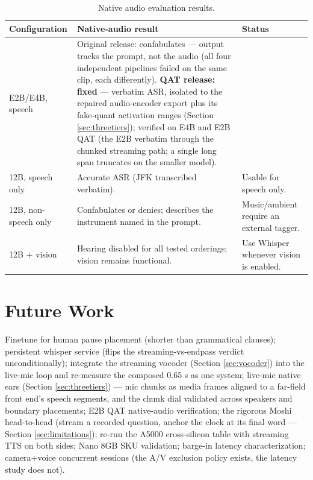 \documentclass{article}
\begin{document}
\begin{table}[H]
	\centering
	\small
	\begin{tabularx}{\textwidth}{lXX}
		\toprule
		Configuration & Native-audio result & Status \\
		\midrule
		E2B/E4B, speech &
		Original release: confabulates — output tracks the prompt, not the audio (all four independent pipelines failed on the same clip, each differently). \textbf{QAT release: fixed} — verbatim ASR, isolated to the repaired audio-encoder export plus its fake-quant activation ranges (Section \ref{sec:threetiers}); verified on E4B and E2B QAT (the E2B verbatim through the chunked streaming path; a single long span truncates on the smaller model). \\

		12B, speech only &
		Accurate ASR (JFK transcribed verbatim). &
		Usable for speech only. \\

		12B, non-speech only &
		Confabulates or denies; describes the instrument named in the prompt. &
		Music/ambient require an external tagger. \\

		12B + vision &
		Hearing disabled for all tested orderings; vision remains functional. &
		Use Whisper whenever vision is enabled. \\
		\bottomrule
	\end{tabularx}
	\caption{Native audio evaluation results.}
	\label{tab:native-audio}
\end{table}

\section{Future Work}
\label{sec:future}

Finetune for human pause placement (shorter than grammatical clauses); persistent whisper service (flips the streaming-vs-endpass verdict unconditionally); integrate the streaming vocoder (Section \ref{sec:vocoder}) into the live-mic loop and re-measure the composed 0.65 s as one system; live-mic native ears (Section \ref{sec:threetiers}) — mic chunks as media frames aligned to a far-field front end's speech segments, and the chunk dial validated across speakers and boundary placements; E2B QAT native-audio verification; the rigorous Moshi head-to-head (stream a recorded question, anchor the clock at its final word — Section \ref{sec:limitations}); re-run the A5000 cross-silicon table with streaming TTS on both sides; Nano 8GB SKU validation; barge-in latency characterization; camera+voice concurrent sessions (the A/V exclusion policy exists, the latency study does not).
\end{document}
